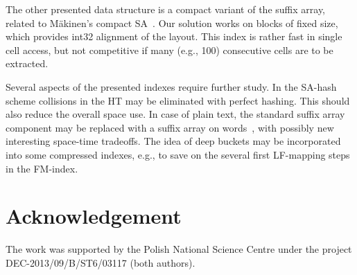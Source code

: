 \documentclass{cai}
\begin{document}
The other presented data structure is a compact variant of the suffix array, 
related to M{\"a}kinen's compact SA~\cite{DBLP:journals/fuin/Makinen03}.
Our solution works on blocks of fixed size, which provides int32 alignment 
of the layout.
This index is rather fast in single cell access, but not competitive 
if many (e.g., 100) consecutive cells are to be extracted.

Several aspects of the presented indexes require further study.
In the SA-hash scheme collisions in the HT may be eliminated 
with 
perfect hashing.
This should also reduce the overall space use.
In case of plain text, the standard suffix array component may be replaced 
with a suffix array on words~\cite{DBLP:conf/cpm/FerraginaF07}, with possibly 
new interesting space-time tradeoffs.
The idea of deep buckets may be incorporated into some compressed indexes, 
e.g., to save on the several first LF-mapping steps in the FM-index.


\section{Acknowledgement}

The work was supported by the Polish National Science Centre under the project DEC-2013/09/B/ST6/03117 (both authors).
\end{document}
